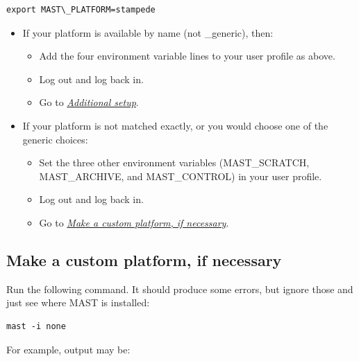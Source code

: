\documentclass[letterpaper,10pt,english]{sphinxmanual}
\begin{document}
\begin{Verbatim}[commandchars=\\\{\}]
export MAST\_PLATFORM=stampede
\end{Verbatim}
\begin{itemize}
\item {} 
If your platform is available by name (not \_generic), then:
\begin{itemize}
\item {} 
Add the four environment variable lines to your user profile as above.

\item {} 
Log out and log back in.

\item {} 
Go to {\hyperref[1_0_installation:additional-setup]{\emph{Additional setup}}}.

\end{itemize}

\item {} 
If your platform is not matched exactly, or you would choose one of the generic choices:
\begin{itemize}
\item {} 
Set the three other environment variables (MAST\_SCRATCH, MAST\_ARCHIVE, and MAST\_CONTROL) in your user profile.

\item {} 
Log out and log back in.

\item {} 
Go to {\hyperref[1_0_installation:make-custom-platform]{\emph{Make a custom platform, if necessary}}}.

\end{itemize}

\end{itemize}


\subsection{Make a custom platform, if necessary}
\label{1_0_installation:make-a-custom-platform-if-necessary}\label{1_0_installation:make-custom-platform}
Run the following command. It should produce some errors, but ignore those and just see where MAST is installed:

\begin{Verbatim}[commandchars=\\\{\}]
mast -i none
\end{Verbatim}

For example, output may be:
\end{document}
